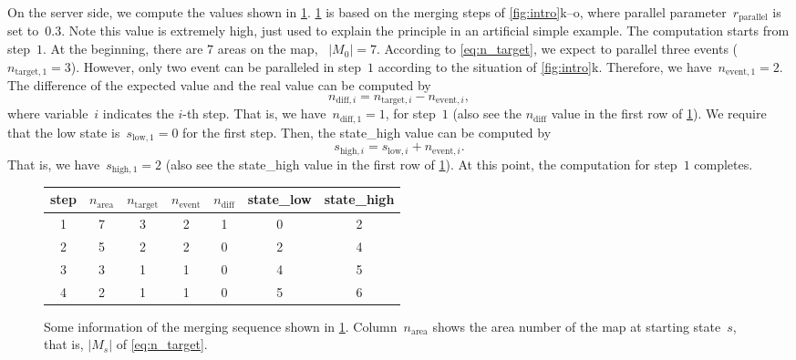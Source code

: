 \documentclass[ijgi,article,submit,moreauthors,pdftex]{Definitions/mdpi}
\begin{document}
On the server side, we compute the values shown in \tbl\ref{tbl:sequence_greedy}.
\tbl\ref{tbl:sequence_greedy} is based on the merging steps of
\fig\ref{fig:intro}k--o,
where parallel parameter~$r_\mathrm{parallel}$ is set to~$0.3$.
Note this value is extremely high, 
just used to explain the principle in an artificial simple example.
The computation starts from step~$1$.
At the beginning, there are $7$ areas on the map, \ie~$|M_0| = 7$.
According to \eq\ref{eq:n_target},
we expect to parallel three events ($n_{\mathrm{target},1} = 3$).
However, only two event can be paralleled in step~$1$ 
according to the situation of \fig\ref{fig:intro}k.
Therefore, we have~$n_{\mathrm{event},1} = 2$.
The difference of the expected value and the real value
can be computed by
\begin{equation}
\label{eq:n_diff}
n_{\mathrm{diff},i} = n_{\mathrm{target},i} - n_{\mathrm{event},i},
\end{equation}
where variable~$i$ indicates the $i$-th step.
That is, we have~$n_{\mathrm{diff},1}=1$, for step~$1$
(also see the $n_\mathrm{diff}$ value in the first row of \tbl\ref{tbl:sequence_greedy}).
We require that the low state is~$s_{\mathrm{low},1} = 0$ for the first step.
Then, the state\_high value can be computed by
\begin{equation}
\label{eq:state_high}
s_{\mathrm{high},i} = s_{\mathrm{low},i} + n_{\mathrm{event},i}.
\end{equation}
That is, we have~$s_{\mathrm{high},1}=2$
(also see the state\_high value in the first row of \tbl\ref{tbl:sequence_greedy}).
At this point, the computation for step~$1$ completes.


\begin{figure}[tb]
%
%
%
\captionsetup*{type=table} %
\caption{Some information of the merging sequence shown in \tbl\ref{tbl:sequence_greedy}.
Column~$n_\mathrm{area}$ shows the area number of the map at starting state~$s$,
that is, $|M_s|$ of \eq\ref{eq:n_target}.
}
\label{tbl:sequence_greedy}
\centering
\begin{tabular}{ccccccc}
\toprule
step & $n_\mathrm{area}$ & $n_\mathrm{target}$ 
& $n_\mathrm{event}$ & $n_\mathrm{diff}$ & state\_low & state\_high \\ \midrule
1        & 7      & 3        & 2        & 1     & 0      & 2      \\
2        & 5      & 2        & 2        & 0     & 2      & 4      \\
3        & 3      & 1        & 1        & 0     & 4      & 5      \\
4        & 2      & 1        & 1        & 0     & 5      & 6      \\
\bottomrule
\end{tabular}
\end{figure}
\end{document}

